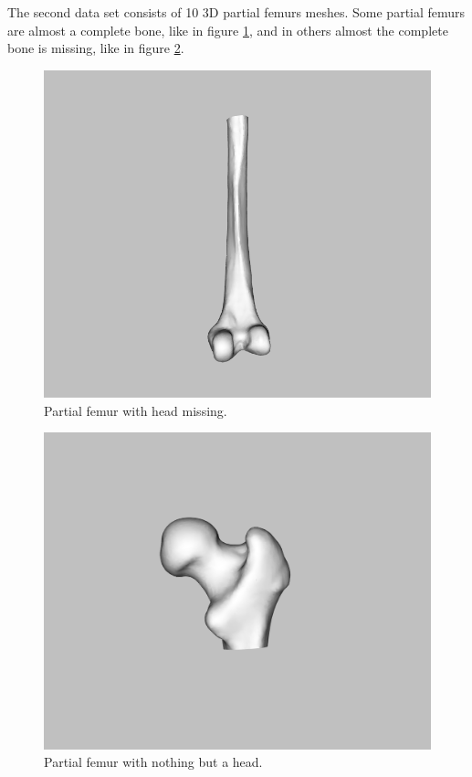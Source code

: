 \documentclass[10pt]{article}
\theoremstyle{definition}
\begin{document}
\noindent
The second data set consists of 10 3D partial femurs meshes. Some partial femurs are almost a complete bone, like in figure \ref{fig:1}, and in others almost the complete bone is missing, like in figure \ref{fig:2}.

\begin{figure}[h]
\includegraphics[scale=0.3]{partial1.png}
\centering
\caption{Partial femur with head missing.}
\label{fig:1}
\end{figure}

\begin{figure}[h]
\includegraphics[scale=0.2]{partial2.png}
\centering
\caption{Partial femur with nothing but a head.}
\label{fig:2}
\end{figure}
\end{document}
